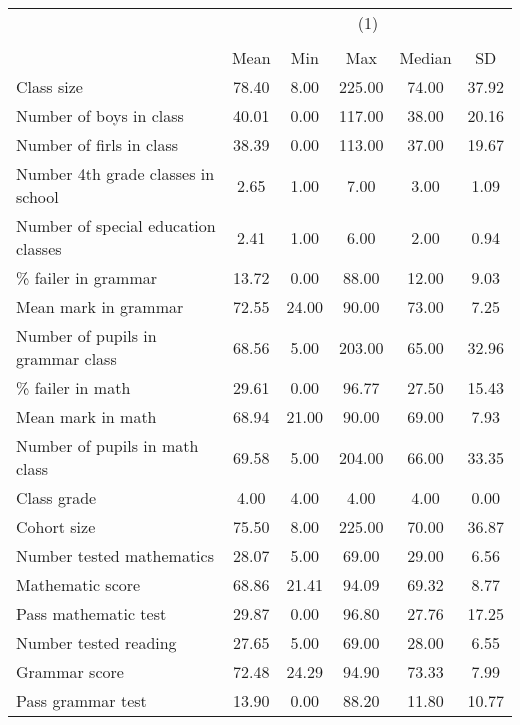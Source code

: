 {
\def\sym#1{\ifmmode^{#1}\else\(^{#1}\)\fi}
\begin{tabular}{l*{1}{ccccc}}
\hline\hline
                    &\multicolumn{5}{c}{(1)}                                         \\
                    &\multicolumn{5}{c}{}                                            \\
                    &        Mean&         Min&         Max&      Median&          SD\\
\hline
Class size          &       78.40&        8.00&      225.00&       74.00&       37.92\\
Number of boys in class&       40.01&        0.00&      117.00&       38.00&       20.16\\
Number of firls in class&       38.39&        0.00&      113.00&       37.00&       19.67\\
Number 4th grade classes in school&        2.65&        1.00&        7.00&        3.00&        1.09\\
Number of special education classes&        2.41&        1.00&        6.00&        2.00&        0.94\\
\% failer in grammar&       13.72&        0.00&       88.00&       12.00&        9.03\\
Mean mark in grammar&       72.55&       24.00&       90.00&       73.00&        7.25\\
Number of pupils in grammar class&       68.56&        5.00&      203.00&       65.00&       32.96\\
\% failer in math   &       29.61&        0.00&       96.77&       27.50&       15.43\\
Mean mark in math   &       68.94&       21.00&       90.00&       69.00&        7.93\\
Number of pupils in math class&       69.58&        5.00&      204.00&       66.00&       33.35\\
Class grade         &        4.00&        4.00&        4.00&        4.00&        0.00\\
Cohort size         &       75.50&        8.00&      225.00&       70.00&       36.87\\
Number tested mathematics&       28.07&        5.00&       69.00&       29.00&        6.56\\
Mathematic score    &       68.86&       21.41&       94.09&       69.32&        8.77\\
Pass mathematic test&       29.87&        0.00&       96.80&       27.76&       17.25\\
Number tested reading&       27.65&        5.00&       69.00&       28.00&        6.55\\
Grammar score       &       72.48&       24.29&       94.90&       73.33&        7.99\\
Pass grammar test   &       13.90&        0.00&       88.20&       11.80&       10.77\\
\hline\hline
\end{tabular}
}
